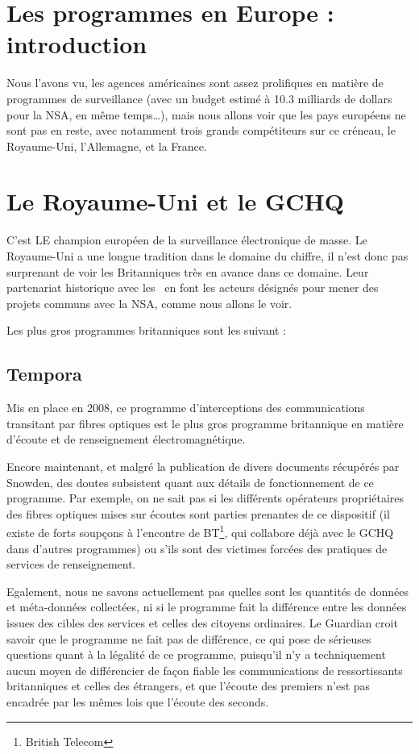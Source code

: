 
\section{Les programmes en Europe : introduction}
Nous l'avons vu, les agences américaines sont assez prolifiques en
matière de programmes de surveillance (avec un budget estimé à 10.3 milliards de
dollars pour la NSA\citep{budget}, en même temps\ldots), mais nous allons voir
que les pays européens ne sont pas en reste, avec notamment trois grands compétiteurs sur ce
créneau, le Royaume-Uni, l'Allemagne, et la France.

\section{Le Royaume-Uni et le GCHQ}

C'est LE champion européen de la surveillance électronique de
masse. Le Royaume-Uni a une longue tradition dans le domaine du chiffre, il
n'est donc pas surprenant de voir les Britanniques très en avance dans ce
domaine. Leur partenariat historique avec les \EUA~en font les acteurs
désignés pour mener des projets communs avec la NSA, comme nous allons le voir.

Les plus gros programmes britanniques sont les suivant :

\subsection{Tempora}

Mis en place en 2008, ce programme d'interceptions des
communications transitant par fibres optiques est le plus gros programme
britannique en matière d'écoute et de renseignement électromagnétique.

Encore maintenant, et malgré la publication de divers documents
récupérés par Snowden, des doutes subsistent quant aux détails de fonctionnement
de ce programme. Par exemple, on ne sait pas si les différents opérateurs
propriétaires des fibres optiques mises sur écoutes sont parties prenantes de ce
dispositif (il existe de forts soupçons à l'encontre de BT\footnote{British
Telecom}, qui collabore déjà avec le GCHQ dans d'autres programmes) ou s'ils
sont des victimes forcées des pratiques de services de renseignement.

Egalement, nous ne savons actuellement pas quelles sont les
quantités de données et méta-données collectées, ni si le programme fait la
différence entre les données issues des cibles des services et celles des
citoyens ordinaires. Le Guardian croit savoir\citep{Tempora} que le programme ne
fait pas de différence, ce qui pose de sérieuses questions quant à la légalité
de ce programme, puisqu'il n'y a techniquement aucun moyen de différencier de
façon fiable les communications de ressortissants britanniques et celles des
étrangers, et que l'écoute des premiers n'est pas encadrée par les mêmes lois
que l'écoute des seconds. 

